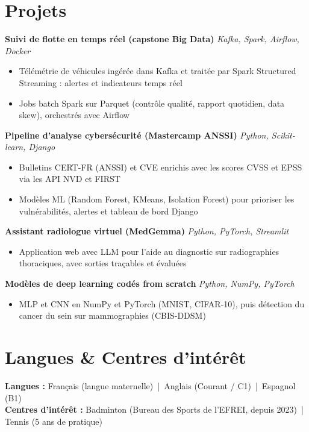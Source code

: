 \documentclass[10pt,a4paper]{article}
\newcommand{\secgap}{\vspace{3.5pt plus 1.5pt minus 1pt}}
\newcommand{\itemgap}{\vspace{2pt plus 1pt minus 0.5pt}}
\begin{document}
\secgap
\section{Projets}

\textbf{Suivi de flotte en temps réel (capstone Big Data)} \hfill \textit{Kafka, Spark, Airflow, Docker}
\begin{itemize}
  \item Télémétrie de véhicules ingérée dans Kafka et traitée par Spark Structured Streaming : alertes et indicateurs temps réel
  \item Jobs batch Spark sur Parquet (contrôle qualité, rapport quotidien, data skew), orchestrés avec Airflow
\end{itemize}

\itemgap
\textbf{Pipeline d'analyse cybersécurité (Mastercamp ANSSI)} \hfill \textit{Python, Scikit-learn, Django}
\begin{itemize}
  \item Bulletins CERT-FR (ANSSI) et CVE enrichis avec les scores CVSS et EPSS via les API NVD et FIRST
  \item Modèles ML (Random Forest, KMeans, Isolation Forest) pour prioriser les vulnérabilités, alertes et tableau de bord Django
\end{itemize}

\itemgap
\textbf{Assistant radiologue virtuel (MedGemma)} \hfill \textit{Python, PyTorch, Streamlit}
\begin{itemize}
  \item Application web avec LLM pour l'aide au diagnostic sur radiographies thoraciques, avec sorties traçables et évaluées
\end{itemize}

\itemgap
\textbf{Modèles de deep learning codés from scratch} \hfill \textit{Python, NumPy, PyTorch}
\begin{itemize}
  \item MLP et CNN en NumPy et PyTorch (MNIST, CIFAR-10), puis détection du cancer du sein sur mammographies (CBIS-DDSM)
\end{itemize}

\secgap
\section{Langues \& Centres d'intérêt}
\textbf{Langues :} Français (langue maternelle) \,|\, Anglais (Courant / C1) \,|\, Espagnol (B1)\\[1.5pt]
\textbf{Centres d'intérêt :} Badminton (Bureau des Sports de l'EFREI, depuis 2023) \,|\, Tennis (5 ans de pratique)
\end{document}
